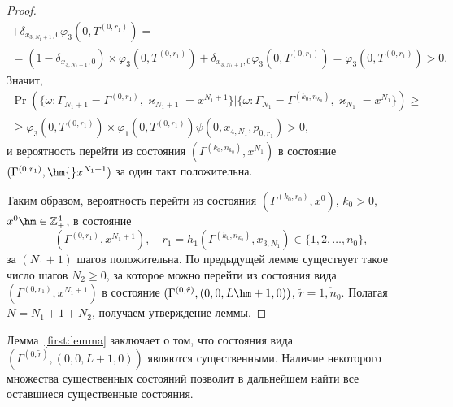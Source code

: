 \begin{proof}
\begin{multline*}
+\delta_{x_{3,  N_1+1},  0} \varphi_3 (0,  T^{(0,  r_1)}) = \\=
(1-\delta_{x_{3,  N_1+1},  0}) \times\varphi_3(0, T^{(0,  r_1)} )
+\delta_{x_{3,  N_1+1},  0} \varphi_3 (0,  T^{(0,  r_1)}) = \varphi_3 (0,  T^{(0,  r_1)})> 0.
\end{multline*}
Значит, 
\begin{multline*}
\Pr (\{\omega\colon \Gamma_{N_1+1}=\Gamma^{(0,  r_1)}, \varkappa_{N_1+1}=x^{N_1+1} \}|\{\omega\colon  \Gamma_{N_1}=\Gamma^{(k_0,  n_{k_0})}, \varkappa_{N_1}=x^{N_1}\})\geqslant\\
\geqslant\varphi_3 (0, T^{(0,  r_1)})
\times
\varphi_1(0, T^{(0,  r_1)})  \psi(0,  x_{4,  N_1},  p_{0,  r_1}) > 0, 
\end{multline*}
и вероятность перейти из состояния $(\Gamma^{(k_0,  n_{k_0})},  x^{N_1})$ в состояние $ (\Gamma^{(0,  r_1)},  \hm{} x^{N_1+1})$ за один такт положительна.

Таким образом,  вероятность перейти из состояния $(\Gamma^{(k_0,  r_0)},  x^0)$,  $k_0>0$,  $x^0 \hm\in \mathbb{Z}_+^4$,  в состояние 
$$(\Gamma^{(0,  r_1)},  x^{N_1+1}),  \quad r_1=h_1(\Gamma^{(k_0,  n_{k_0})},  x_{3,  N_1}) \in \{1,  2,  \ldots,  n_0\}, $$
за $(N_1+1)$ шагов положительна. По предыдущей лемме существует такое число шагов $N_2 \geqslant 0$,  за которое можно перейти из состояния вида $(\Gamma^{(0, r_1)},  x^{N_1+1})$ в состояние $(\Gamma^{(0,  \tilde{r})},  (0,  0,  L\hm+1,  0))$,  $\tilde{r}=\overline{1,  n_0}$. Полагая $N=N_1+1+N_2$,  получаем утверждение леммы.
\end{proof}


Лемма~\ref{first:lemma} заключает о том,  что состояния вида $(\Gamma^{(0, \tilde{r})}, (0, 0, L+1, 0) )$ являются существенными. Наличие некоторого множества существенных состояний позволит в дальнейшем найти все оставшиеся существенные состояния.

